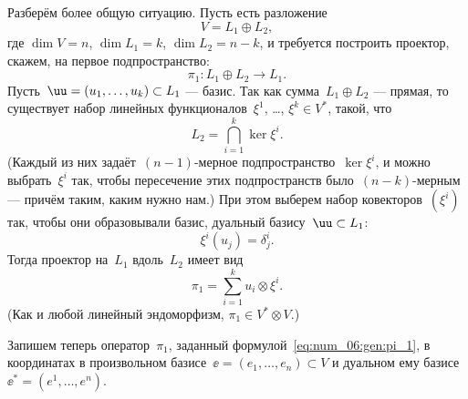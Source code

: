 \begin{solution}
	Разберём более общую ситуацию. Пусть есть разложение
	\[
		V = L_1 \oplus L_2
		,
	\]
	где $\dim{V} = n$, $\dim{L_1} = k$, $\dim{L_2} = n - k$, и требуется построить проектор, скажем, на первое подпространство:
	\[
		\pi_1 \colon L_1 \oplus L_2 \to L_1
		.
	\]
	Пусть~$\uu = (u_1, \dots, u_k) \subset L_1$ --- базис. Так как сумма~$L_1 \oplus L_2$ --- прямая, то существует набор линейных функционалов~$\xi^1$, \dots, $\xi^k \in V^*$, такой, что
	\[
		L_2 =
		\bigcap_{i = 1}^k
			\ker{\xi^i}
		.
	\]
	(Каждый из них задаёт~$(n-1)$-мерное подпространство~$\ker{\xi^i}$, и можно выбрать~$\xi^i$ так, чтобы пересечение этих подпространств было~$(n-k)$-мерным --- причём таким, каким нужно нам.) При этом выберем набор ковекторов~$(\xi^i)$ так, чтобы они образовывали базис, дуальный базису~$\uu \subset L_1$:
	\[
		\xi^i(u_j) = \delta^i_j
		.
	\]
	Тогда проектор на~$L_1$ вдоль~$L_2$ имеет вид
	\begin{equation}
		\label{eq:num_06:gen:pi_1}
		\pi_1 =
		\sum_{i = 1}^k
			u_i \otimes \xi^i
		.
	\end{equation}
	(Как и любой линейный эндоморфизм, $\pi_1 \in V^* \otimes V$.)
	
	Запишем теперь оператор~$\pi_1$, заданный формулой~\eqref{eq:num_06:gen:pi_1}, в координатах в произвольном базисе~$\ee = (e_1, \dots, e_n) \subset V$ и дуальном ему базисе~$\ee^* = (e^1, \dots, e^n)$.


\end{solution}
